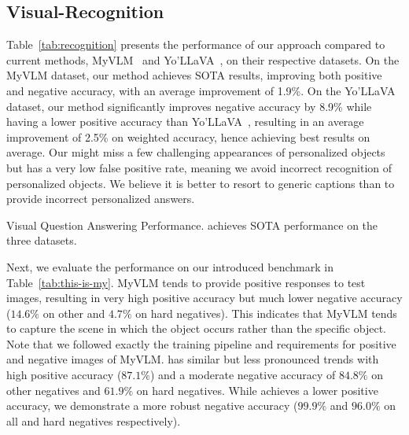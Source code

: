\subsection{Visual-Recognition }
\vspace{-0.2cm}
Table~\ref{tab:recognition} presents the performance of our approach compared to current methods, MyVLM~\cite{alaluf2024myvlm} and Yo’LLaVA~\cite{nguyen2024yo}, on their respective datasets. On the MyVLM dataset, our method \ours achieves SOTA results, improving both positive and negative accuracy, with an average improvement of 1.9\%. On the Yo’LLaVA dataset, our method significantly improves negative accuracy by 8.9\% while having a lower positive accuracy than Yo’LLaVA~\cite{nguyen2024yo}, resulting in an average improvement of 2.5\% on weighted accuracy, hence achieving best results on average. Our \ours might miss a few challenging appearances of personalized objects but has a very low false positive rate, meaning we avoid incorrect recognition of personalized objects. We believe it is better to resort to generic captions than to provide incorrect personalized answers.
 \begin{table}[t!]
 \centering
    
    \vspace{-0.2cm}
      \caption{Visual Question Answering Performance. \ours achieves SOTA performance on the three datasets. }
      \vspace{-0.6cm}
      \label{tab:VQA}
\end{table}
Next, we evaluate the performance on our introduced benchmark \thisismy in Table~\ref{tab:this-is-my}. 
MyVLM tends to provide positive responses to test images, resulting in very high positive accuracy but much lower negative accuracy ($14.6\%$  on other  and $4.7\%$ on hard negatives). This indicates that MyVLM tends to capture the scene in which the object occurs rather than the specific object. Note that we followed exactly the training pipeline and requirements for positive and negative images of MyVLM. \yollava has similar but less pronounced trends with  high positive accuracy ($87.1\%$) and a moderate negative accuracy of $84.8\%$ on other negatives and $61.9\%$ on hard negatives. While \ours achieves a lower positive accuracy, we demonstrate a more robust negative accuracy ($99.9\%$ and $96.0\%$ on all and hard negatives respectively).

